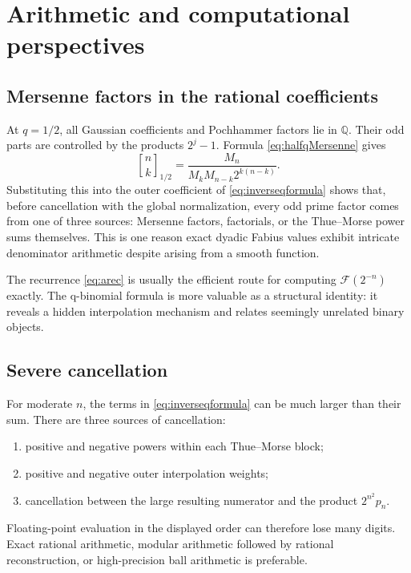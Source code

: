 \documentclass[11pt,oneside]{article}
\theoremstyle{definition}
\theoremstyle{remark}
\newcommand{\halfqbinom}[2]{{\genfrac{[}{]}{0pt}{}{#1}{#2}}_{1/2}}
\newcommand{\F}{\mathcal F}
\newcommand{\Q}{\mathbb Q}
\begin{document}
\section{Arithmetic and computational perspectives}
\label{sec:computation}

\subsection{Mersenne factors in the rational coefficients}

At $q=1/2$, all Gaussian coefficients and Pochhammer factors lie in $\Q$.
Their odd parts are controlled by the products $2^j-1$.  Formula
\eqref{eq:halfqMersenne} gives
\[
 \halfqbinom{n}{k}
 =\frac{M_n}{M_kM_{n-k}2^{k(n-k)}}.
\]
Substituting this into the outer coefficient of
\eqref{eq:inverseqformula} shows that, before cancellation with the global
normalization, every odd prime factor comes from one of three sources:
Mersenne factors, factorials, or the Thue--Morse power sums themselves.
This is one reason exact dyadic Fabius values exhibit intricate denominator
arithmetic despite arising from a smooth function.

The recurrence \eqref{eq:arec} is usually the efficient route for computing
$\F(2^{-n})$ exactly.  The q-binomial formula is more valuable as a
structural identity: it reveals a hidden interpolation mechanism and relates
seemingly unrelated binary objects.

\subsection{Severe cancellation}

For moderate $n$, the terms in \eqref{eq:inverseqformula} can be much larger
than their sum.  There are three sources of cancellation:
\begin{enumerate}[leftmargin=2.2em]
\item positive and negative powers within each Thue--Morse block;
\item positive and negative outer interpolation weights;
\item cancellation between the large resulting numerator and the product
$2^{n^2}p_n$.
\end{enumerate}
Floating-point evaluation in the displayed order can therefore lose many
digits.  Exact rational arithmetic, modular arithmetic followed by rational
reconstruction, or high-precision ball arithmetic is preferable.
\end{document}
